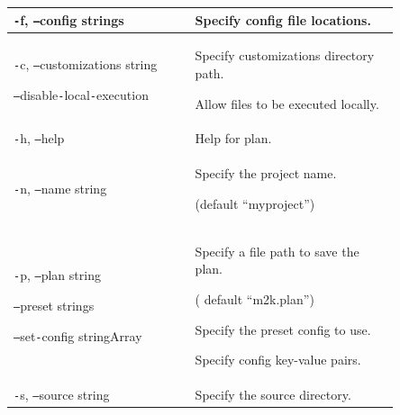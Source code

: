 \documentclass[twocolumn]{article}
\newcommand{\lightlexendfont}[1]{{\lightlexendfontfamily #1}}
\newcommand{\tfontsize}{\fontsize{6}{12}\selectfont}
\newcommand{\dash}{\texttt{-}}
\newcommand{\doubledash}{\texttt{--}}
\begin{document}
{{\begin{table}[H]
{\begin{tabular}{|>{\tfontsize}p{0.4\linewidth}|>{\tfontsize}p{0.45\linewidth}|}
      \dash f, \doubledash config strings                          & \lightlexendfont{Specify config file locations.}        \\
      \hline
      \dash c, \doubledash customizations string

      \vspace{0.25\baselineskip}

      \hspace{0.3cm} \doubledash disable\dash local\dash execution & \lightlexendfont{Specify customizations directory path.

        \vspace{0.25\baselineskip}

      Allow files to be executed locally.}                                                                                   \\ 
      \hline \dash h, \doubledash help &
      \lightlexendfont{Help for plan.}                                                                                       \\ 
      \hline \dash n, \doubledash name string &
      \lightlexendfont{Specify the project name.

      (default “myproject”)}                                                                                                 \\
      \hline
      \dash p, \doubledash plan string
      \vspace{1.25\baselineskip}

      \hspace{0.3cm} \doubledash preset strings

      \vspace{0.25\baselineskip}

      \hspace{0.3cm} \doubledash set\dash config stringArray       & \lightlexendfont{Specify a file path to save the plan.

        ( default “m2k.plan”)

        \vspace{0.25\baselineskip}

        Specify the preset config to use.

        \vspace{0.25\baselineskip}

      Specify config key-value pairs.}                                                                                       \\ 
        \hline \dash s, \doubledash source string &
         \lightlexendfont{Specify the source directory.

}
\end{tabular}}
\end{table}}}
\end{document}
